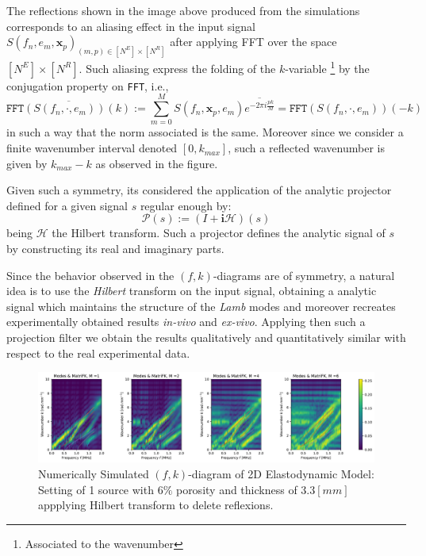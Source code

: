 The reflections shown in the image above produced from the simulations corresponds to an aliasing effect in the input signal $S(f_n, e_m, \mathbf{x}_p)_{(m,p) \in [N^E]\times [N^R]}$ after applying FFT over the space $[N^E] \times [N^R]$. Such aliasing express the folding of the $k$-variable \footnote{Associated to the wavenumber} by the conjugation property on \texttt{FFT}, i.e., 
\begin{equation*}
    \overline{\texttt{FFT}(S(f_n, \cdot, e_m))(k)} := \sum_{m=0}^M S(f_n, \mathbf{x}_p, e_m) \overline{e^{-2 \pi i \frac{p k}{M}}} = \texttt{FFT}(S(f_n, \cdot, e_m))(-k)
\end{equation*}
in such a way that the norm associated is the same. Moreover since we consider a finite wavenumber interval denoted $[0, k_{max}]$, such a reflected wavenumber is given by $k_{max}-k$ as observed in the figure.

Given such a symmetry, its considered the application of the analytic projector defined for a given signal $s$ regular enough by:
\begin{equation*}
    \mathcal{P}(s) := (I + \mathbf{i}\mathcal{H})(s)
\end{equation*}
being $\mathcal{H}$ the Hilbert transform. Such a projector defines the analytic signal of $s$ by constructing its real and imaginary parts.

Since the behavior observed in the $(f,k)$-diagrams are of symmetry, a natural idea is to use the \textit{Hilbert} transform on the input signal, obtaining a analytic signal which maintains the structure of the \textit{Lamb} modes and moreover recreates experimentally obtained results \textit{in-vivo} and \textit{ex-vivo}.
Applying then such a projection filter we obtain the results qualitatively and quantitatively similar with respect to the real experimental data.

\begin{figure}[!h]
	\centering
	\includegraphics[width=\textwidth]{images/TimeSingSous/2DTimeHilb_P6ElasticFK33M1460_y.pdf}
	\caption{Numerically Simulated $(f,k)$-diagram of 2D Elastodynamic Model: Setting of 1 source with $6\%$ porosity and thickness of $3.3 [mm]$ appplying Hilbert transform to delete reflexions.}
	\label{FK-Hil-DiagramS1P6M33}
\end{figure} 

